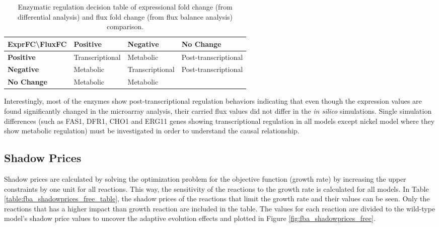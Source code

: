 \baselineskip
\begin{table}[H]
\begin{center}
\caption[Enzymatic regulation decision table of expressional fold change (from differential analysis) and flux fold change (from flux balance analysis) comparison.]{Enzymatic regulation decision table \cite{bordel2010sampling} of expressional fold change (from differential analysis) and flux fold change (from flux balance analysis) comparison.}
\baselineskip
\label{table:regulation_table}
\begin{tabular}{l|l|l|l|}
\cline{2-4}
\textbf{ExprFC\textbackslash FluxFC} & \textbf{Positive} & \textbf{Negative} & \textbf{No Change} \\ \hline
\multicolumn{1}{|l|}{\textbf{Positive}}  & Transcriptional & Metabolic       & Post-transcriptional \\ \hline
\multicolumn{1}{|l|}{\textbf{Negative}}  & Metabolic       & Transcriptional & Post-transcriptional \\ \hline
\multicolumn{1}{|l|}{\textbf{No Change}} & Metabolic       & Metabolic       &                      \\ \hline
\end{tabular}
\end{center}
\end{table}

Interestingly, most of the enzymes show post-transcriptional regulation behaviors indicating that even though the expression values are found significantly changed in the microarray analysis, their carried flux values did not differ in the \emph{in silico} simulations. Single simulation differences (such as FAS1, DFR1, CHO1 and ERG11 genes showing transcriptional regulation in all models except nickel model where they show metabolic regulation) must be investigated in order to understand the causal relationship.

\subsection{Shadow Prices}
Shadow prices are calculated by solving the optimization problem for the objective function (growth rate) by increasing the upper constraints by one unit for all reactions. This way, the sensitivity of the reactions to the growth rate is calculated for all models. In Table \ref{table:fba_shadowprices_free_table}, the shadow prices of the reactions that limit the growth rate and their values can be seen. Only the reactions that has a higher impact than growth reaction are included in the table. The values for each reaction are divided to the wild-type model's shadow price values to uncover the adaptive evolution effects and plotted in Figure \ref{fig:fba_shadowprices_free}.


